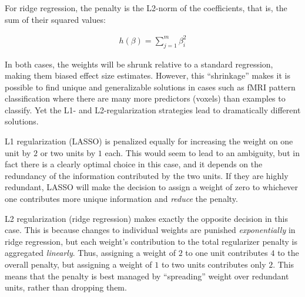 For ridge regression, the penalty is the L2-norm of the coefficients, that is, the sum of their squared values:

\begin{align}
h(\beta) = \sum^m_{j=1}\beta_i^2
\label{eq.ridge}
\end{align}

In both cases, the weights will be shrunk relative to a standard regression, making them biased effect size estimates. However, this ``shrinkage'' makes it is possible to find unique and generalizable solutions in cases such as fMRI pattern classification where there are many more predictors (voxels) than examples to classify. Yet the L1- and L2-regularization strategies lead to dramatically different solutions. 



L1 regularization (LASSO) is penalized equally for increasing the weight on one unit by $2$ or two units by $1$ each. This would seem to lead to an ambiguity, but in fact there is a clearly optimal choice in this case, and it depends on the redundancy of the information contributed by the two units. If they are highly redundant, LASSO will make the decision to assign a weight of zero to whichever one contributes more unique information and {\em reduce} the penalty.

L2 regularization (ridge regression) makes exactly the opposite decision in this case. This is because changes to individual weights are punished {\em exponentially} in ridge regression, but each weight's contribution to the total regularizer penalty is aggregated {\em linearly}. Thus, assigning a weight of $2$ to one unit contributes $4$ to the overall penalty, but assigning a weight of $1$ to two units contributes only $2$. This means that the penalty is best managed by ``spreading'' weight over redundant units, rather than dropping them.

